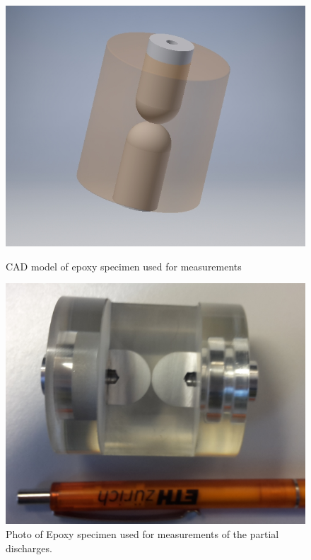\begin{figure}[!ht]
  \begin{minipage}{0.5\textwidth}
  

  
  \centerline{\includegraphics[height=0.2\textheight]{figures/intro/cad_epoxy}}
\caption{CAD model of epoxy specimen used for measurements}
	\label{fig.specimen}
	
	  \end{minipage}
	    \begin{minipage}{0.5\textwidth}
	  
  \centerline{\includegraphics[height=0.2\textheight]{figures/intro/photo_epoxy2}}
\caption{Photo of Epoxy specimen used for measurements of the partial discharges. \protect\footnotemark}
	\label{fig.specimenphoto}
	  
	   \end{minipage}
\end{figure}
